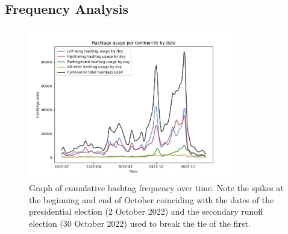 \documentclass[a4paper,11pt]{article}  %
\begin{document}
	\subsection{Frequency Analysis}
	\begin{figure}%
		\begin{center}
			\includegraphics[width=0.8\textwidth]{images/plt_major_appearances}
		\end{center}
		\caption{Graph of cumulative hashtag frequency over time. Note the spikes at the beginning and end of October coinciding with the dates of the presidential election (2 October 2022) and the secondary runoff election (30 October 2022) used to break the tie of the first.}
		\label{fig:8}
	\end{figure}
	
\end{document}
